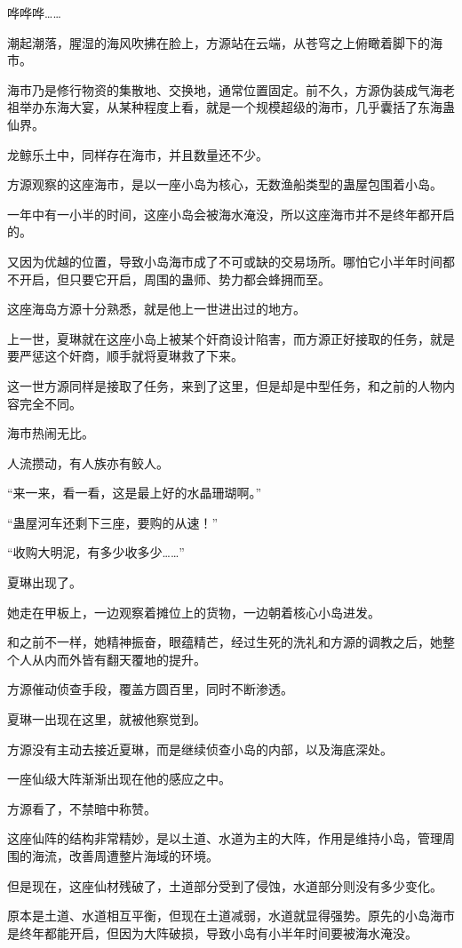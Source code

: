 \begin{this_body}
哗哗哗……

潮起潮落，腥湿的海风吹拂在脸上，方源站在云端，从苍穹之上俯瞰着脚下的海市。

海市乃是修行物资的集散地、交换地，通常位置固定。前不久，方源伪装成气海老祖举办东海大宴，从某种程度上看，就是一个规模超级的海市，几乎囊括了东海蛊仙界。

龙鲸乐土中，同样存在海市，并且数量还不少。

方源观察的这座海市，是以一座小岛为核心，无数渔船类型的蛊屋包围着小岛。

一年中有一小半的时间，这座小岛会被海水淹没，所以这座海市并不是终年都开启的。

又因为优越的位置，导致小岛海市成了不可或缺的交易场所。哪怕它小半年时间都不开启，但只要它开启，周围的蛊师、势力都会蜂拥而至。

这座海岛方源十分熟悉，就是他上一世进出过的地方。

上一世，夏琳就在这座小岛上被某个奸商设计陷害，而方源正好接取的任务，就是要严惩这个奸商，顺手就将夏琳救了下来。

这一世方源同样是接取了任务，来到了这里，但是却是中型任务，和之前的人物内容完全不同。

海市热闹无比。

人流攒动，有人族亦有鲛人。

“来一来，看一看，这是最上好的水晶珊瑚啊。”

“蛊屋河车还剩下三座，要购的从速！”

“收购大明泥，有多少收多少……”

夏琳出现了。

她走在甲板上，一边观察着摊位上的货物，一边朝着核心小岛进发。

和之前不一样，她精神振奋，眼蕴精芒，经过生死的洗礼和方源的调教之后，她整个人从内而外皆有翻天覆地的提升。

方源催动侦查手段，覆盖方圆百里，同时不断渗透。

夏琳一出现在这里，就被他察觉到。

方源没有主动去接近夏琳，而是继续侦查小岛的内部，以及海底深处。

一座仙级大阵渐渐出现在他的感应之中。

方源看了，不禁暗中称赞。

这座仙阵的结构非常精妙，是以土道、水道为主的大阵，作用是维持小岛，管理周围的海流，改善周遭整片海域的环境。

但是现在，这座仙材残破了，土道部分受到了侵蚀，水道部分则没有多少变化。

原本是土道、水道相互平衡，但现在土道减弱，水道就显得强势。原先的小岛海市是终年都能开启，但因为大阵破损，导致小岛有小半年时间要被海水淹没。


\end{this_body}
